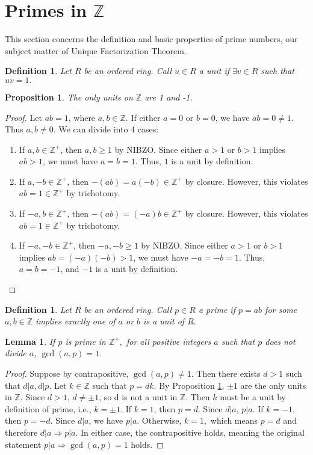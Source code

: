 \documentclass{article}
\newcommand{\Z}{\mathbb{Z}}
\newcommand{\st}{such that }
\newtheorem{defn}[thm]{Definition}
\newtheorem{lem}[thm]{Lemma}
\newtheorem{prop}[thm]{Proposition}
\begin{document}
\section{Primes in $\Z$}
This section concerns the definition and basic properties of prime numbers, our subject matter of Unique Factorization Theorem. 
\begin{defn}
\label{unit}
Let $R$ be an ordered ring. Call $u\in R$ a unit if $\exists v\in R$ such that $uv = 1.$
\end{defn}

\begin{prop}
The only units on $\Z$ are 1 and -1. 
\end{prop}
\begin{proof}
Let $ab=1$, where $a,b\in \Z$. If either $a=0$ or $b=0$, we have $ab=0\neq 1$. Thus $a,b\neq 0$. We can divide into 4 cases:
\begin{enumerate}
    \item If $a,b\in \Z^+$, then $a,b\geq 1$ by NIBZO. Since either $a>1$ or $b>1$ implies $ab>1$, we must have $a=b=1$. Thus, $1$ is a unit by definition. 
    \item If $a,-b\in \Z^+$, then $-(ab)=a(-b)\in \Z^{+}$ by closure. However, this violates $ab=1\in \Z^{+}$ by trichotomy. 
    \item If $-a,b\in \Z^+$, then $-(ab)=(-a)b\in \Z^{+}$ by closure. However, this violates $ab=1\in \Z^{+}$ by trichotomy.  
    \item If $-a,-b\in \Z^+$, then $-a,-b\geq 1$ by NIBZO. Since either $a>1$ or $b>1$ implies $ab=(-a)(-b)>1$, we must have $-a=-b=1$. Thus, $a=b=-1$, and $-1$ is a unit by definition.
\end{enumerate}
\end{proof}

\begin{defn}
\label{prime}
Let $R$ be an ordered ring. Call $p\in R$ a prime if $p=ab$ for some $a,b\in \Z$ implies exactly one of $a$ or $b$ is a unit of $R.$  
\end{defn}

\begin{lem}
\label{gcdp} If $p$ is prime in $\Z^{+},$ for all positive integers $a$ \st $p$ does not divide $a$, $\gcd(a,p)=1$.
\end{lem}

\begin{proof}
Suppose by contrapositive, $\gcd(a, p) \neq 1$. Then there exists $d > 1$ \st $d|a, d|p$. Let $k \in \Z$ \st $p = d k$. By Proposition \ref{unit}, $\pm 1$ are the only units in $\Z$. Since $d>1$, $d \neq \pm 1$, so d is not a unit in $\Z$. Then $k$ must be a unit by definition of prime, i.e., $k = \pm 1$. If $k = 1$, then $p =d$. Since $d | a$, $p | a$. If $k = -1$, then $p = -d$. Since $d|a$, we have $p|a$. Otherwise, $k=1,$ which means $p=d$ and therefore $d|a \Rightarrow p|a.$ In either case, the contrapositive holds, meaning the original statement $p|a\Rightarrow\gcd(a, p)=1$ holds.
\end{proof}
\end{document}
